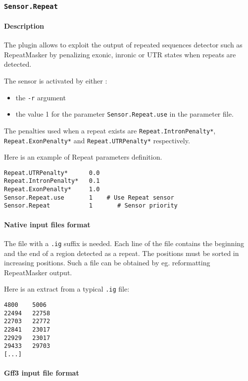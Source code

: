 
\subsubsection{\texttt{Sensor.Repeat}}

\paragraph{Description}

The plugin allows to exploit the output of repeated sequences detector
such as RepeatMasker by penalizing exonic, inronic or UTR states when
repeats are detected.

The sensor is activated by either :
\begin{itemize}
\item the \texttt{-r} argument 
\item the value 1 for the parameter \texttt{Sensor.Repeat.use} in the
  parameter file.
\end{itemize}
The penalties used when a repeat exists are \texttt{Repeat.IntronPenalty*},
\texttt{Repeat.ExonPenalty*} and \texttt{Repeat.UTRPenalty*}
respectively.

Here is an example of Repeat parameters definition.
\begin{Verbatim}[fontsize=\small]
Repeat.UTRPenalty*      0.0
Repeat.IntronPenalty*   0.1
Repeat.ExonPenalty*     1.0
Sensor.Repeat.use       1    # Use Repeat sensor
Sensor.Repeat           1       # Sensor priority
\end{Verbatim}

\paragraph{Native input files format}

The file with a \texttt{.ig} suffix is needed. Each line of the file
contains the beginning and the end of a region detected as a
repeat. The positions must be sorted in increasing positions. Such a
file can be obtained by eg. reformatting RepeatMasker output.

Here is an extract from a typical \texttt{.ig} file:
\begin{Verbatim}[fontsize=\small]
4800    5006
22494   22758
22703   22772
22841   23017
22929   23017
29433   29703
[...]
\end{Verbatim}

\paragraph{Gff3 input file format}

